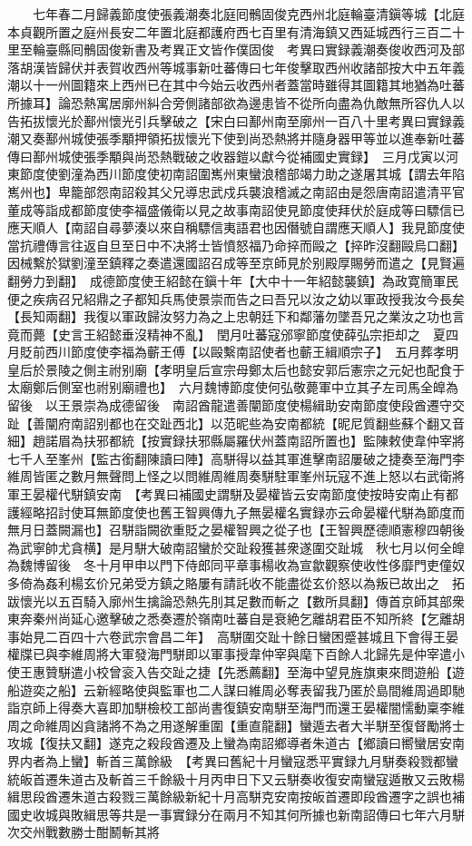 　　七年春二月歸義節度使張義潮奏北庭囘鶻固俊克西州北庭輪臺清鎭等城【北庭本貞觀所置之庭州長安二年置北庭都護府西七百里有清海鎮又西延城西行三百二十里至輪臺縣囘鶻固俊新書及考異正文皆作僕固俊　考異曰實録義潮奏俊收西河及部落胡漢皆歸伏并表賀收西州等城事新吐蕃傳曰七年俊擊取西州收諸部按大中五年義潮以十一州圖籍來上西州已在其中今始云收西州者蓋當時雖得其圖籍其地猶為吐蕃所據耳】論恐熱寓居廓州糾合旁側諸部欲為邊患皆不從所向盡為仇敵無所容仇人以告拓拔懷光於鄯州懷光引兵擊破之【宋白曰鄯州南至廓州一百八十里考異曰實録義潮又奏鄯州城使張季顒押領拓拔懷光下使到尚恐熱將并隨身器甲等並以進奉新吐蕃傳曰鄯州城使張季顒與尚恐熱戰破之收器鎧以獻今從補國史實録】　三月戊寅以河東節度使劉潼為西川節度使初南詔圍嶲州東蠻浪稽部竭力助之遂屠其城【謂去年陷嶲州也】卑籠部怨南詔殺其父兄導忠武戍兵襲浪稽滅之南詔由是怨唐南詔遣清平官董成等詣成都節度使李福盛儀衛以見之故事南詔使見節度使拜伏於庭成等曰驃信已應天順人【南詔自尋夢湊以來自稱驃信夷語君也因僭號自謂應天順人】我見節度使當抗禮傳言往返自旦至日中不决將士皆憤怒福乃命捽而毆之【捽昨沒翻毆烏口翻】因械繫於獄劉潼至鎮釋之奏遣還國詔召成等至京師見於别殿厚賜勞而遣之【見賢遍翻勞力到翻】　成德節度使王紹懿在鎭十年【大中十一年紹懿襲鎮】為政寛簡軍民便之疾病召兄紹鼎之子都知兵馬使景崇而告之曰吾兄以汝之幼以軍政授我汝今長矣【長知兩翻】我復以軍政歸汝努力為之上忠朝廷下和鄰藩勿墜吾兄之業汝之功也言竟而薨【史言王紹懿垂沒精神不亂】　閏月吐蕃寇邠寧節度使薛弘宗拒却之　夏四月貶前西川節度使李福為蘄王傅【以毆繫南詔使者也蘄王緝順宗子】　五月葬孝明皇后於景陵之側主祔别廟【孝明皇后宣宗母鄭太后也懿安郭后憲宗之元妃也配食于太廟鄭后側室也祔别廟禮也】　六月魏博節度使何弘敬薨軍中立其子左司馬全皥為留後　以王景崇為成德留後　南詔酋龍遣善闡節度使楊緝助安南節度使段酋遷守交趾【善闡府南詔别都也在交趾西北】以范昵些為安南都統【昵尼質翻些蘇个翻又音細】趙諾眉為扶邪都統【按實録扶邪縣屬羅伏州蓋南詔所置也】監陳敕使韋仲宰將七千人至峯州【監古銜翻陳讀曰陣】高駢得以益其軍進擊南詔屢破之捷奏至海門李維周皆匿之數月無聲問上怪之以問維周維周奏駢駐軍峯州玩寇不進上怒以右武衛將軍王晏權代駢鎮安南　【考異曰補國史謂駢及晏權皆云安南節度使按時安南止有都護經略招討使耳無節度使也舊王智興傳九子無晏權名實録亦云命晏權代駢為節度而無月日蓋闕漏也】召駢詣闕欲重貶之晏權智興之從子也【王智興歷德順憲穆四朝後為武寧帥尤貪横】是月駢大破南詔蠻於交趾殺獲甚衆遂圍交趾城　秋七月以何全皥為魏博留後　冬十月甲申以門下侍郎同平章事楊收為宣歙觀察使收性侈靡門吏僮奴多倚為姦利楊玄价兄弟受方鎮之賂屢有請託收不能盡從玄价怒以為叛已故出之　拓跋懷光以五百騎入廓州生擒論恐熱先刖其足數而斬之【數所具翻】傳首京師其部衆東奔秦州尚延心邀擊破之悉奏遷於嶺南吐蕃自是衰絶乞離胡君臣不知所終【乞離胡事始見二百四十六卷武宗會昌二年】　高駢圍交趾十餘日蠻困蹙甚城且下會得王晏權牒已與李維周將大軍發海門駢即以軍事授韋仲宰與麾下百餘人北歸先是仲宰遣小使王惠贊駢遣小校曾衮入告交趾之捷【先悉薦翻】至海中望見旌旗東來問遊船【遊船遊奕之船】云新經略使與監軍也二人謀曰維周必奪表留我乃匿於島間維周過即馳詣京師上得奏大喜即加駢檢校工部尚書復鎮安南駢至海門而還王晏權闇懦動稟李維周之命維周凶貪諸將不為之用遂解重圍【重直龍翻】蠻遁去者大半駢至復督勵將士攻城【復扶又翻】遂克之殺段酋遷及上蠻為南詔鄉導者朱道古【鄉讀曰嚮蠻居安南界内者為上蠻】斬首三萬餘級　【考異曰舊紀十月蠻寇悉平實録九月駢奏殺戮都蠻統皈首遷朱道古及斬首三千餘級十月丙申日下又云駢奏收復安南蠻寇遁散又云敗楊緝思段酋遷朱道古殺戮三萬餘級新紀十月高駢克安南按皈首遷即段酋遷字之誤也補國史收城與敗緝思等共是一事實録分在兩月不知其何所據也新南詔傳曰七年六月駢次交州戰數勝士酣鬭斬其將